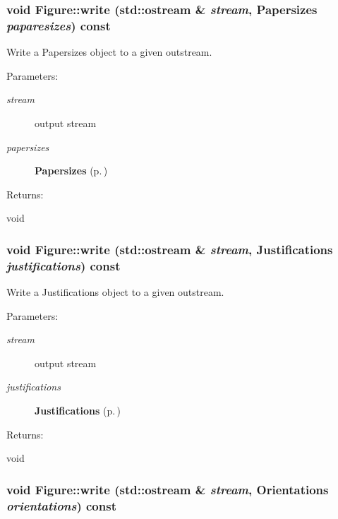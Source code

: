 \subsubsection{\setlength{\rightskip}{0pt plus 5cm}void Figure::write (std::ostream \& {\em stream}, {\bf Papersizes} {\em paparesizes}) const}\label{classFigure_a23}


Write a Papersizes object to a given outstream. \begin{Desc}
\item[Parameters: ]\par
\begin{description}
\item[{\em 
stream}]output stream \item[{\em 
papersizes}]{\bf Papersizes} {\rm (p.\,\pageref{classFigure_s26})} \end{description}
\end{Desc}
\begin{Desc}
\item[Returns: ]\par
void \end{Desc}
\subsubsection{\setlength{\rightskip}{0pt plus 5cm}void Figure::write (std::ostream \& {\em stream}, {\bf Justifications} {\em justifications}) const}\label{classFigure_a22}


Write a Justifications object to a given outstream. \begin{Desc}
\item[Parameters: ]\par
\begin{description}
\item[{\em 
stream}]output stream \item[{\em 
justifications}]{\bf Justifications} {\rm (p.\,\pageref{classFigure_s24})} \end{description}
\end{Desc}
\begin{Desc}
\item[Returns: ]\par
void \end{Desc}
\subsubsection{\setlength{\rightskip}{0pt plus 5cm}void Figure::write (std::ostream \& {\em stream}, {\bf Orientations} {\em orientations}) const}\label{classFigure_a21}


